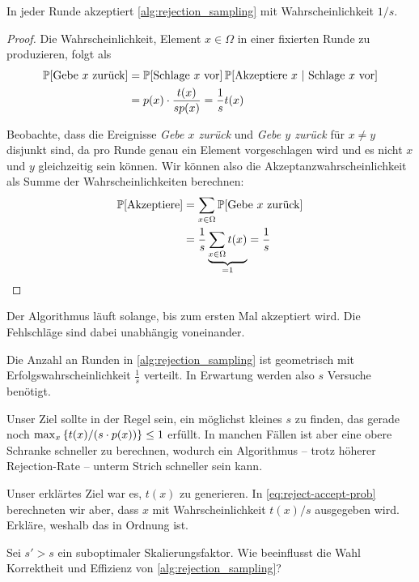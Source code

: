 \begin{lemma}
    In jeder Runde akzeptiert \cref{alg:rejection_sampling} mit Wahrscheinlichkeit $1 / s$.
\end{lemma}

\begin{proof}
    Die Wahrscheinlichkeit, Element $x \in \Omega$ in einer fixierten Runde zu produzieren, folgt als
    \begin{align}
        \mathbb{P}\!\left[\text{Gebe $x$ zurück}\right] & = \mathbb{P}\!\left[\text{Schlage $x$ vor}\right] \mathbb{P}\!\left[\text{Akzeptiere $x$} \ \middle|\ \text{Schlage $x$ vor}\right] \\
                                      & = p(x) \cdot \frac{t(x)}{s p(x)} = \frac{1}{s} t(x) \label{eq:reject-accept-prob}
    \end{align}

    Beobachte, dass die Ereignisse \emph{Gebe $x$ zurück} und \emph{Gebe $y$ zurück} für $x \ne y$ disjunkt sind, da pro Runde genau ein Element vorgeschlagen wird und es nicht $x$ und $y$ gleichzeitig sein können.
    Wir können also die Akzeptanzwahrscheinlichkeit als Summe der Wahrscheinlichkeiten berechnen:
    \begin{align}
        \mathbb{P}\!\left[\text{Akzeptiere}\right] & = \sum_{x \in \Omega} \mathbb{P}\!\left[\text{Gebe $x$ zurück}\right]                    \\
                                 & = \frac{1}{s} \underbrace{\sum_{x \in \Omega} t(x)}_{=1} = \frac{1}{s}
        \qedhere
    \end{align}
\end{proof}

Der Algorithmus läuft solange, bis zum ersten Mal akzeptiert wird.
Die Fehlschläge sind dabei unabhängig voneinander.

\begin{corollary}\label{cor:laufzeit-rejection-sampling}
    Die Anzahl an Runden in \cref{alg:rejection_sampling} ist geometrisch mit Erfolgswahrscheinlichkeit $\frac{1}{s}$ verteilt.
    In Erwartung werden also $s$ Versuche benötigt.
\end{corollary}

Unser Ziel sollte in der Regel sein, ein möglichst kleines $s$ zu finden, das gerade noch $\max_x \left\{t(x) / (s \cdot p(x))\right\} \le 1$ erfüllt.
In manchen Fällen ist aber eine obere Schranke schneller zu berechnen, wodurch ein Algorithmus -- trotz höherer Rejection-Rate -- unterm Strich schneller sein kann.

\begin{exercise}
    Unser erklärtes Ziel war es, $t(x)$ zu generieren.
    In \cref{eq:reject-accept-prob} berechneten wir aber, dass $x$ mit Wahrscheinlichkeit $t(x) / s$ ausgegeben wird.
    Erkläre, weshalb das in Ordnung ist.

    Sei $s' > s$ ein suboptimaler Skalierungsfaktor.
    Wie beeinflusst die Wahl Korrektheit und Effizienz von \cref{alg:rejection_sampling}?
\end{exercise}

